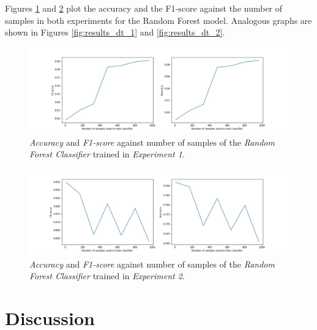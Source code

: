 \documentclass[sigplan,screen]{acmart}
\begin{document}
Figures \ref{fig:results_rf_1} and \ref{fig:results_rf_2} plot the accuracy and the F1-score against the number of samples in both experiments for the Random Forest model. Analogous graphs are shown in Figures \ref{fig:results_dt_1} and \ref{fig:results_dt_2}.

 \begin{figure}[h]
     \centering
     \includegraphics[width=\linewidth]{reports/figures/results_rf_1.jpg}
     \caption{\emph{Accuracy} and \emph{F1-score} against number of samples of the \emph{Random Forest Classifier} trained in \emph{Experiment 1}.}
     \label{fig:results_rf_1}
 \end{figure}
 
  \begin{figure}[h]
     \centering
     \includegraphics[width=\linewidth]{reports/figures/results_rf_2.jpg}
     \caption{\emph{Accuracy} and \emph{F1-score} against number of samples of the \emph{Random Forest Classifier} trained in \emph{Experiment 2}.}
     \label{fig:results_rf_2}
 \end{figure}

\section{Discussion}\label{sec:discussion}
\end{document}
